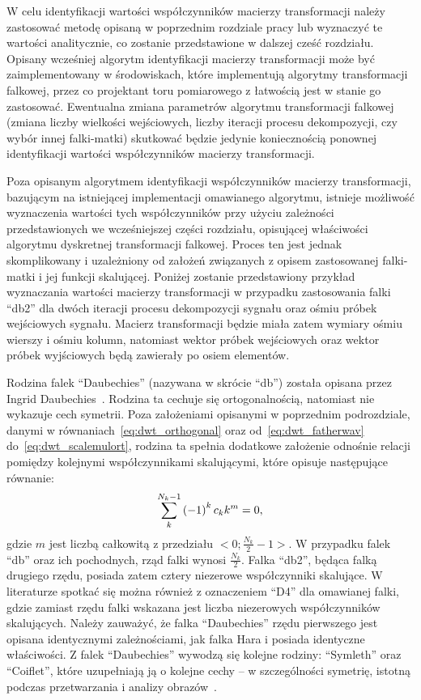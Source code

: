 W celu identyfikacji wartości współczynników macierzy transformacji należy zastosować metodę opisaną w poprzednim rozdziale pracy lub wyznaczyć te wartości analitycznie, co zostanie przedstawione w dalszej cześć rozdziału. Opisany wcześniej algorytm identyfikacji macierzy transformacji może być zaimplementowany w środowiskach, które implementują algorytmy transformacji falkowej, przez co projektant toru pomiarowego z łatwością jest w stanie go zastosować. Ewentualna zmiana parametrów algorytmu transformacji falkowej (zmiana liczby wielkości wejściowych, liczby iteracji procesu dekompozycji, czy wybór innej falki-matki) skutkować będzie jedynie koniecznością ponownej identyfikacji wartości współczynników macierzy transformacji.

Poza opisanym algorytmem identyfikacji współczynników macierzy transformacji, bazującym na istniejącej implementacji omawianego algorytmu, istnieje możliwość wyznaczenia wartości tych współczynników przy użyciu zależności przedstawionych we wcześniejszej części rozdziału, opisującej właściwości algorytmu dyskretnej transformacji falkowej. Proces ten jest jednak skomplikowany i uzależniony od założeń związanych z opisem zastosowanej falki-matki i jej funkcji skalującej. Poniżej zostanie przedstawiony przykład wyznaczania wartości macierzy transformacji w przypadku zastosowania falki \enquote{db2} dla dwóch iteracji procesu dekompozycji sygnału oraz ośmiu próbek wejściowych sygnału. Macierz transformacji będzie miała zatem wymiary ośmiu wierszy i ośmiu kolumn, natomiast wektor próbek wejściowych oraz wektor próbek wyjściowych będą zawierały po osiem elementów.

Rodzina falek \enquote{Daubechies} (nazywana w skrócie \enquote{db}) została opisana przez Ingrid Daubechies~\cite{vonesch_dbbasics}. Rodzina ta cechuje się ortogonalnością, natomiast nie wykazuje cech symetrii. Poza założeniami opisanymi w poprzednim podrozdziale, danymi w równaniach~\eqref{eq:dwt_orthogonal} oraz od~\eqref{eq:dwt_fatherwav} do~\eqref{eq:dwt_scalemulort}, rodzina ta spełnia dodatkowe założenie odnośnie relacji pomiędzy kolejnymi współczynnikami skalującymi, które opisuje następujące równanie:
\begin{equation}
\sum _{k} ^{N_k-1} \left(-1\right)^{k} c_{k} k^{m} = 0 \label{eq:db_musthave},
\end{equation}
gdzie $m$ jest liczbą całkowitą z przedziału $<0;\frac{N_{k}}{2}-1>$. W przypadku falek \enquote{db} oraz ich pochodnych, rząd falki wynosi $\frac{N_{k}}{2}$. Falka \enquote{db2}, będąca falką drugiego rzędu, posiada zatem cztery niezerowe współczynniki skalujące. W literaturze spotkać się można również z oznaczeniem \enquote{D4} dla omawianej falki, gdzie zamiast rzędu falki wskazana jest liczba niezerowych współczynników skalujących. Należy zauważyć, że falka \enquote{Daubechies} rzędu pierwszego jest opisana identycznymi zależnościami, jak falka Hara i posiada identyczne właściwości. Z falek \enquote{Daubechies} wywodzą się kolejne rodziny: \enquote{Symleth} oraz \enquote{Coiflet}, które uzupełniają ją o kolejne cechy -- w szczególności symetrię, istotną podczas przetwarzania i analizy obrazów~\cite{wallen_handbook, akujuobi_applications}.

